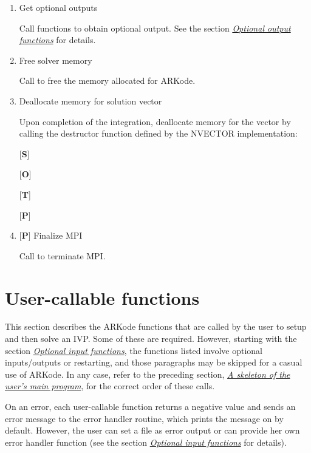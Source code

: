 \documentclass[letterpaper,10pt,english]{sphinxmanual}
\begin{document}
\begin{enumerate}
\item {} 
Get optional outputs

Call  functions to obtain optional output. See
the section {\hyperref[c_interface/User_callable:cinterface-optionaloutputs]{\emph{Optional output functions}}} for details.

\item {} 
Free solver memory

Call  to free the memory allocated for ARKode.

\item {} 
Deallocate memory for solution vector

Upon completion of the integration, deallocate memory for the
vector  by calling the destructor function defined by the
NVECTOR implementation:

{[}\textbf{S}{]} 

{[}\textbf{O}{]} 

{[}\textbf{T}{]} 

{[}\textbf{P}{]} 

\item {} 
{[}\textbf{P}{]} Finalize MPI

Call  to terminate MPI.

\end{enumerate}


\section{User-callable functions}
\label{c_interface/User_callable::doc}\label{c_interface/User_callable:user-callable-functions}\label{c_interface/User_callable:cinterface-usercallable}
This section describes the ARKode functions that are called by the
user to setup and then solve an IVP. Some of these are
required. However, starting with the section
{\hyperref[c_interface/User_callable:cinterface-optionalinputs]{\emph{Optional input functions}}}, the functions listed involve
optional inputs/outputs or restarting, and those paragraphs may be
skipped for a casual use of ARKode. In any
case, refer to the preceding section, {\hyperref[c_interface/Skeleton:cinterface-skeleton]{\emph{A skeleton of the user's main program}}}, for
the correct order of these calls.

On an error, each user-callable function returns a negative value and
sends an error message to the error handler routine, which prints the
message on  by default. However, the user can set a file as
error output or can provide her own error handler function
(see the section {\hyperref[c_interface/User_callable:cinterface-optionalinputs]{\emph{Optional input functions}}} for details).
\end{document}
